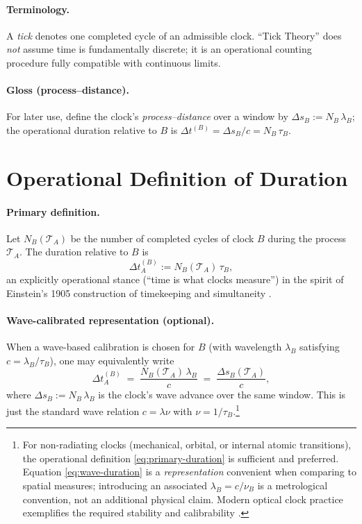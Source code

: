 \documentclass[12pt]{article}
\begin{document}
\paragraph{Terminology.}
A \emph{tick} denotes one completed cycle of an admissible clock. “Tick Theory” does \emph{not} assume time is fundamentally discrete; it is an operational counting procedure fully compatible with continuous limits.

\paragraph{Gloss (process–distance).}
For later use, define the clock’s \emph{process–distance} over a window by
\(\Delta s_B := N_B\,\lambda_B\); the operational duration relative to \(B\) is
\(\Delta t^{(B)}=\Delta s_B/c = N_B\,\tau_B\).

\section{Operational Definition of Duration}

\paragraph{Primary definition.}
Let \(N_B(\mathcal{T}_A)\) be the number of completed cycles of clock \(B\) during the process \(\mathcal{T}_A\).
The duration relative to \(B\) is
\begin{equation}
    \Delta t_A^{(B)} := N_B(\mathcal{T}_A)\,\tau_B,
    \label{eq:primary-duration}
\end{equation}
an explicitly operational stance (“time is what clocks measure”) in the spirit of Einstein’s 1905 construction of timekeeping and simultaneity \cite{Einstein1905}.

\paragraph{Wave-calibrated representation (optional).}
When a wave-based calibration is chosen for \(B\) (with wavelength \(\lambda_B\) satisfying \(c=\lambda_B/\tau_B\)), one may equivalently write
\begin{equation}
    \Delta t_A^{(B)} \;=\; \frac{N_B(\mathcal{T}_A)\,\lambda_B}{c}
    \;=\; \frac{\Delta s_B(\mathcal{T}_A)}{c},
    \label{eq:wave-duration}
\end{equation}
where \(\Delta s_B := N_B\,\lambda_B\) is the clock’s wave advance over the same window.
This is just the standard wave relation \(c=\lambda\nu\) with \(\nu=1/\tau_B\).\footnote{For non-radiating clocks (mechanical, orbital, or internal atomic transitions), the operational definition \eqref{eq:primary-duration} is sufficient and preferred.
Equation \eqref{eq:wave-duration} is a \emph{representation} convenient when comparing to spatial measures; introducing an associated \(\lambda_B=c/\nu_B\) is a metrological convention, not an additional physical claim.
Modern optical clock practice exemplifies the required stability and calibrability \cite{Chou2010}.}
\end{document}
